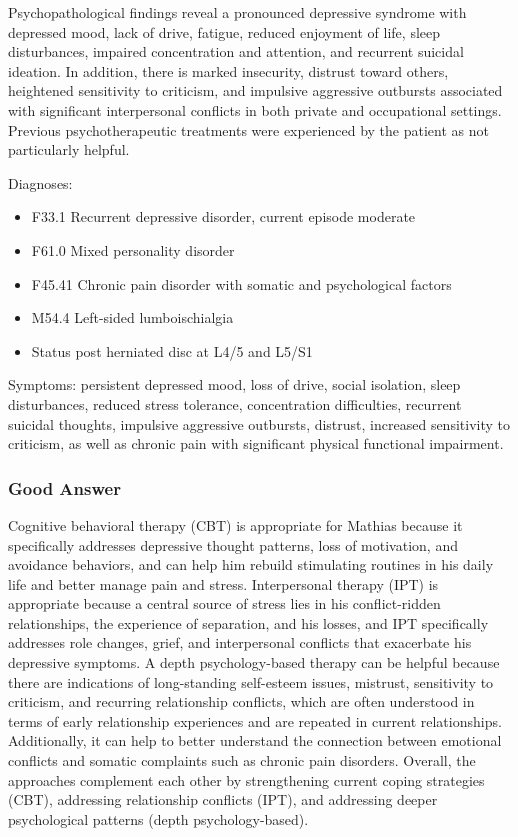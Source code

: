 Psychopathological findings reveal a pronounced depressive syndrome with depressed mood, lack of drive, fatigue, reduced enjoyment of life, sleep disturbances, impaired concentration and attention, and recurrent suicidal ideation.
In addition, there is marked insecurity, distrust toward others, heightened sensitivity to criticism, and impulsive aggressive outbursts associated with significant interpersonal conflicts in both private and occupational settings.
Previous psychotherapeutic treatments were experienced by the patient as not particularly helpful.

Diagnoses:
\begin{itemize}
\item F33.1 Recurrent depressive disorder, current episode moderate
\item F61.0 Mixed personality disorder
\item F45.41 Chronic pain disorder with somatic and psychological factors
\item M54.4 Left-sided lumboischialgia
\item Status post herniated disc at L4/5 and L5/S1
\end{itemize}
Symptoms: persistent depressed mood, loss of drive, social isolation, sleep disturbances, reduced stress tolerance, concentration difficulties, recurrent suicidal thoughts, impulsive aggressive outbursts, distrust, increased sensitivity to criticism, as well as chronic pain with significant physical functional impairment.
\subsubsection{Good Answer}
Cognitive behavioral therapy (CBT) is appropriate for Mathias because it specifically addresses depressive thought patterns, loss of motivation, and avoidance behaviors, and can help him rebuild stimulating routines in his daily life and better manage pain and stress.
Interpersonal therapy (IPT) is appropriate because a central source of stress lies in his conflict-ridden relationships, the experience of separation, and his losses, and IPT specifically addresses role changes, grief, and interpersonal conflicts that exacerbate his depressive symptoms.
A depth psychology-based therapy can be helpful because there are indications of long-standing self-esteem issues, mistrust, sensitivity to criticism, and recurring relationship conflicts, which are often understood in terms of early relationship experiences and are repeated in current relationships.
Additionally, it can help to better understand the connection between emotional conflicts and somatic complaints such as chronic pain disorders.
Overall, the approaches complement each other by strengthening current coping strategies (CBT), addressing relationship conflicts (IPT), and addressing deeper psychological patterns (depth psychology-based).

